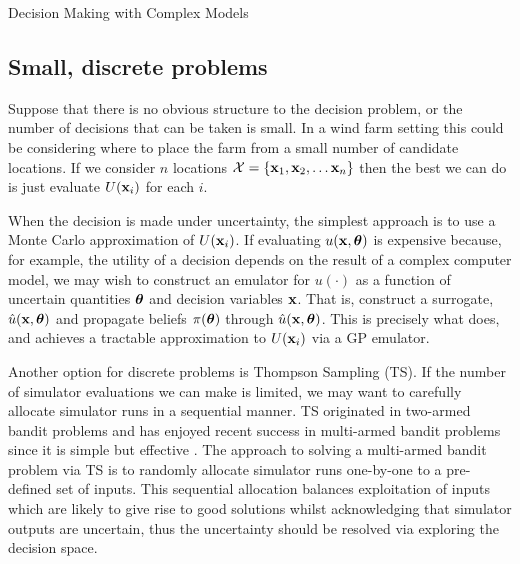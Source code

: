 \begin{chapter}{Decision Making with Complex Models \label{Chap:optimisation}}
\subsection{Small, discrete problems}
Suppose that there is no obvious structure to the decision problem, or the number of decisions that can be taken is small. In a wind farm setting this could be considering where to place the farm from a small number of candidate locations. If we consider $n$ locations $\mathcal{X} = \{ \mathbf{x}_1, \mathbf{x}_2, \ldots \mathbf{x}_n \}$ then the best we can do is just evaluate $U(\mathbf{x}_i)$ for each $i$.

When the decision is made under uncertainty, the simplest approach is to use a Monte Carlo approximation of $U(\mathbf{x}_i)$. If evaluating $u(\mathbf{x}, \bm{\theta})$ is expensive because, for example, the utility of a decision depends on the result of a complex computer model, we may wish to construct an emulator for $u(\cdot)$ as a function of uncertain quantities $\bm{\bm{\theta}}$ and decision variables $\mathbf{x}$. That is, construct a surrogate, $\hat{u}(\mathbf{x}, \bm{\theta})$ and propagate beliefs $\pi(\bm{\bm{\theta}})$ through $\hat{u}(\mathbf{x}, \bm{\theta})$. This is precisely what \citet{Oakley2009} does, and achieves a tractable approximation to $U(\mathbf{x}_i)$ via a GP emulator.

Another option for discrete problems is Thompson Sampling (TS). If the number of simulator evaluations we can make is limited, we may want to carefully allocate simulator runs in a sequential manner. TS originated in two-armed bandit problems \citep{Thompson1933} and has enjoyed recent success in multi-armed bandit problems since it is simple but effective \citep{Scott2010, Chapelle2011}. The approach to solving a multi-armed bandit problem via TS is to randomly allocate simulator runs one-by-one to a pre-defined set of inputs. This sequential allocation balances exploitation of inputs which are likely to give rise to good solutions whilst acknowledging that simulator outputs are uncertain, thus the uncertainty should be resolved via exploring the decision space.


\end{chapter}
